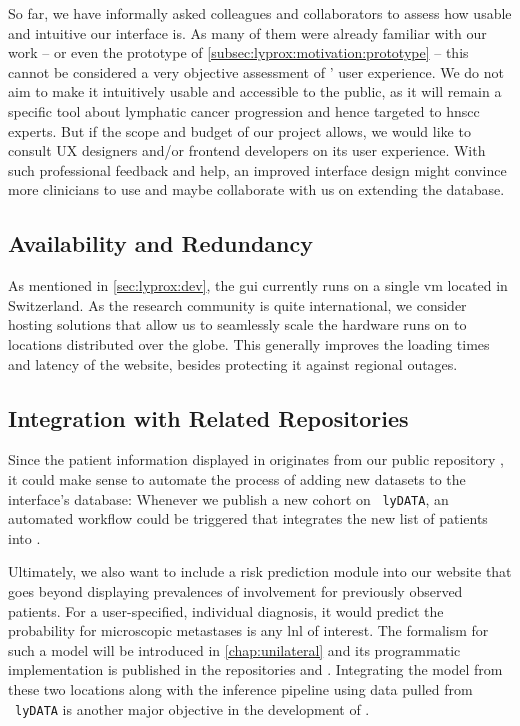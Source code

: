 \documentclass[\relativeRoot/main.tex]{subfiles}
\begin{document}
So far, we have informally asked colleagues and collaborators to assess how usable and intuitive our interface is. As many of them were already familiar with our work -- or even the prototype of \cref{subsec:lyprox:motivation:prototype} -- this cannot be considered a very objective assessment of \inlinelyproxlogo{}' user experience. We do not aim to make it intuitively usable and accessible to the public, as it will remain a specific tool about lymphatic cancer progression and hence targeted to \gls{hnscc} experts. But if the scope and budget of our project allows, we would like to consult UX designers and/or frontend developers on its user experience. With such professional feedback and help, an improved interface design might convince more clinicians to use \inlinelyproxlogo{} and maybe collaborate with us on extending the database.

\subsection*{Availability and Redundancy}

As mentioned in \cref{sec:lyprox:dev}, the \gls{gui} currently runs on a single \acrlong{vm} located in Switzerland. As the research community is quite international, we consider hosting solutions that allow us to seamlessly scale the hardware \inlinelyproxlogo{} runs on to locations distributed over the globe. This generally improves the loading times and latency of the website, besides protecting it against regional outages.

\subsection*{Integration with Related Repositories}

Since the patient information displayed in \inlinelyproxlogo{} originates from our public repository , it could make sense to automate the process of adding new datasets to the interface's database: Whenever we publish a new cohort on ~\texttt{lyDATA}, an automated workflow could be triggered that integrates the new list of patients into \inlinelyproxlogo{}.

Ultimately, we also want to include a risk prediction module into our website that goes beyond displaying prevalences of involvement for previously observed patients. For a user-specified, individual diagnosis, it would predict the probability for microscopic metastases is any \gls{lnl} of interest. The formalism for such a model will be introduced in \cref{chap:unilateral} and its programmatic implementation is published in the repositories  and . Integrating the model from these two locations along with the inference pipeline using data pulled from ~\texttt{lyDATA} is another major objective in the development of \inlinelyproxlogo{}.
\end{document}
